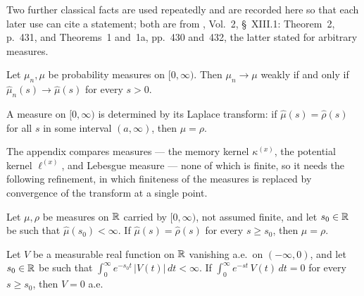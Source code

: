 Two further classical facts are used repeatedly and are recorded here so that each later
use can cite a statement; both are from , Vol.~2,
\S~XIII.1: Theorem~2, p.~431, and Theorems~1 and~1a, pp.~430 and~432, the latter stated
for arbitrary measures.

\begin{proposition}\label{prop:laplace-continuity}
Let $\mu_n, \mu$ be probability measures on $[0,\infty)$. Then $\mu_n \to \mu$ weakly if and
only if $\hat\mu_n(s) \to \hat\mu(s)$ for every $s > 0$.
\end{proposition}

\begin{proposition}\label{prop:laplace-uniqueness}
A measure on $[0,\infty)$ is determined by its Laplace transform: if $\hat\mu(s) = \hat\rho(s)$
for all $s$ in some interval $(a,\infty)$, then $\mu = \rho$.
\end{proposition}

The appendix compares measures --- the memory kernel $\kappa^{(x)}$, the potential kernel
$\ell^{(x)}$, and Lebesgue measure --- none of which is finite, so it needs the following
refinement, in which finiteness of the measures is replaced by convergence of the transform
at a single point.

\begin{proposition}\label{prop:laplace-uniqueness-sigma-finite}
Let $\mu, \rho$ be measures on $\mathbb{R}$ carried by $[0,\infty)$, not assumed finite, and let
$s_0 \in \mathbb{R}$ be such that $\hat\mu(s_0) < \infty$. If $\hat\mu(s) = \hat\rho(s)$ for every
$s \ge s_0$, then $\mu = \rho$.
\end{proposition}

\begin{corollary}\label{cor:laplace-uniqueness-signed}
Let $V$ be a measurable real function on $\mathbb{R}$ vanishing a.e.\ on $(-\infty, 0)$, and let
$s_0 \in \mathbb{R}$ be such that $\int_0^\infty e^{-s_0 t}\,|V(t)|\,dt < \infty$. If
$\int_0^\infty e^{-st}\,V(t)\,dt = 0$ for every $s \ge s_0$, then $V = 0$ a.e.
\end{corollary}

